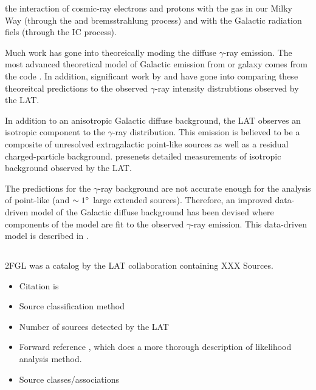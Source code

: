 the interaction of cosmic-ray electrons and protons with the gas in our
Milky Way (through the \pion and bremsstrahlung process) and with the
Galactic radiation fiels (through the \ac{IC} process).

Much work has gone into theoreically moding the diffuse
$\gamma$-ray emission. The most advanced theoretical model
of Galactic emission from or galaxy comes from the \galprop code
\citep{strong_1998a_propagation-cosmic-ray,moskalenko_2000a_anisotropic-inverse}.
In addition, significant work by \cite{abdo_2009a_fermi-large} and
\cite{ackermann_2012a_fermi-lat-observations} have gone into comparing
these theoreitcal predictions to the observed $\gamma$-ray intensity
distrubtions observed by the \ac{LAT}.

In addition to an anisotropic Galactic diffuse background, the \ac{LAT}
observes an isotropic component to the $\gamma$-ray distribution.
This emission is believed to be a composite of unresolved extragalactic
point-like sources as well as a residual charged-particle background.
\cite{abdo_2010a_spectrum-isotropic} presenets detailed measurements of
isotropic background observed by the \ac{LAT}.

The \galprop predictions for the $\gamma$-ray background are not
accurate enough for the analysis of point-like (and $\sim1^\circ$
large extended sources).  Therefore, an improved data-driven model
of the Galactic diffuse background has been devised where components
of the \galprop model are fit to the observed $\gamma$-ray emission.
This data-driven model is described in \cite{nolan_2012_fermi-large}.


\subsection{}

\Ac{2FGL} was a catalog by the \ac{LAT} collaboration containing XXX Sources.

\begin{itemize}
  \item Citation is \cite{nolan_2012_fermi-large}
  \item Source classification method
  \item Number of sources detected by the \ac{LAT}
  \item Forward reference ,
    which does a more thorough description of likelihood analysis method.
  \item Source classes/associations
\end{itemize}

